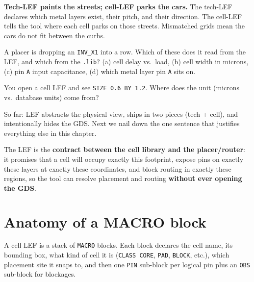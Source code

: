 \begin{hook}
\textbf{Tech-LEF paints the streets; cell-LEF parks the cars.} The tech-LEF declares which metal layers exist, their pitch, and their direction. The cell-LEF tells the tool where each cell parks on those streets. Mismatched grids mean the cars do not fit between the curbs.
\end{hook}

\begin{gut}
A placer is dropping an \texttt{INV\_X1} into a row. Which of these does it read from the LEF, and which from the \texttt{.lib}? (a) cell delay vs.\ load, (b) cell width in microns, (c) pin \texttt{A} input capacitance, (d) which metal layer pin \texttt{A} sits on.
\end{gut}

\begin{gut}
You open a cell LEF and see \texttt{SIZE 0.6 BY 1.2}. Where does the unit (microns vs.\ database units) come from?
\end{gut}

\begin{pausebox}
So far: LEF abstracts the physical view, ships in two pieces (tech + cell), and intentionally hides the GDS. Next we nail down the one sentence that justifies everything else in this chapter.
\end{pausebox}

\begin{keyidea}
The LEF is the \textbf{contract between the cell library and the placer/router}: it promises that a cell will occupy exactly this footprint, expose pins on exactly these layers at exactly these coordinates, and block routing in exactly these regions, so the tool can resolve placement and routing \textbf{without ever opening the GDS}.
\end{keyidea}

\section{Anatomy of a MACRO block}

A cell LEF is a stack of \texttt{MACRO} blocks. Each block declares the cell name, its bounding box, what kind of cell it is (\texttt{CLASS CORE}, \texttt{PAD}, \texttt{BLOCK}, etc.), which placement site it snaps to, and then one \texttt{PIN} sub-block per logical pin plus an \texttt{OBS} sub-block for blockages.

